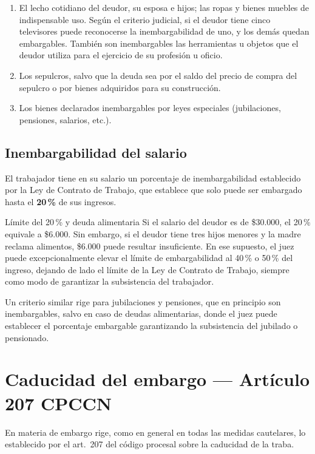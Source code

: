 \documentclass[12pt,oneside]{book}
\begin{document}
\begin{enumerate}[label=\textbf{Inciso \arabic*°:}, leftmargin=2.4cm]
    \item El lecho cotidiano del deudor, su esposa e hijos; las ropas y bienes muebles de indispensable uso. Según el criterio judicial, si el deudor tiene cinco televisores puede reconocerse la inembargabilidad de uno, y los demás quedan embargables. También son inembargables las herramientas u objetos que el deudor utiliza para el ejercicio de su profesión u oficio.
    \item Los sepulcros, salvo que la deuda sea por el saldo del precio de compra del sepulcro o por bienes adquiridos para su construcción.
    \item Los bienes declarados inembargables por leyes especiales (jubilaciones, pensiones, salarios, etc.).
\end{enumerate}

\subsection{Inembargabilidad del salario}

El trabajador tiene en su salario un porcentaje de inembargabilidad establecido por la Ley de Contrato de Trabajo, que establece que solo puede ser embargado hasta el \textbf{20\,\%} de sus ingresos.

\begin{example}{Límite del 20\,\% y deuda alimentaria}
Si el salario del deudor es de \$30.000, el 20\,\% equivale a \$6.000. Sin embargo, si el deudor tiene tres hijos menores y la madre reclama alimentos, \$6.000 puede resultar insuficiente. En ese supuesto, el juez puede excepcionalmente elevar el límite de embargabilidad al 40\,\% o 50\,\% del ingreso, dejando de lado el límite de la Ley de Contrato de Trabajo, siempre como modo de garantizar la subsistencia del trabajador.
\end{example}

Un criterio similar rige para jubilaciones y pensiones, que en principio son inembargables, salvo en caso de deudas alimentarias, donde el juez puede establecer el porcentaje embargable garantizando la subsistencia del jubilado o pensionado.

\section{Caducidad del embargo --- Artículo 207 CPCCN}

En materia de embargo rige, como en general en todas las medidas cautelares, lo establecido por el art.\ 207 del código procesal sobre la caducidad de la traba.
\end{document}

